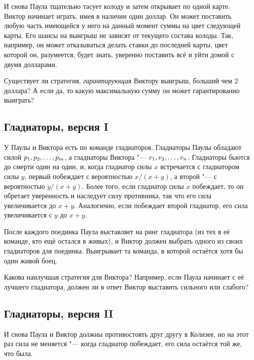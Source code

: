 \documentclass[twoside]{book}
\makeatletter
\newcommand{\rindex}[2][\imki@jobname]{%
  \index[#1]{\detokenize{#2}}%
}
\makeatother
\begin{document}
И снова Паула тщательно тасует колоду и затем открывает по одной карте.
Виктор начинает играть, имея в наличии один доллар.
Он может поставить  любую часть имеющейся у него на данный момент суммы на цвет следующей карты.
Его шансы на выигрыш не зависят от текущего состава колоды.
Так, например, он может отказываться делать ставки до последней карты, цвет которой он, разумеется, будет знать, уверенно поставить всё и уйти домой с двумя долларами.


Существует ли стратегия, \emph{гарантирующая} Виктору выигрыш, больший чем 2 доллара?
А если да, то какую максимальную сумму он может гарантированно выиграть? 

\subsection*{Гладиаторы, версия I} %
\rindex{Гладиаторы, версия I}

У Паулы и Виктора есть по команде гладиаторов.
Гладиаторы Паулы обладают силой $p_1, p_2,\z\dots, p_m$, а гладиаторы Виктора "--- $v_1, v_2,\z\dots, v_n$.
Гладиаторы бьются до смерти один на один, и, когда гладиатор силы $x$ встречается с гладиатором силы $y$, первый побеждает с вероятностью $x/(x+y)$, а второй "--- с вероятностью $y/(x+y)$.
Более того, если гладиатор силы $x$ побеждает, то он обретает уверенность и наследует силу противника, так что его сила увеличивается до $x+y$.
Аналогично, если побеждает второй гладиатор, его сила увеличивается с $y$ до $x+y$.

После каждого поединка Паула выставляет на ринг гладиатора (из тех в её команде, кто ещё остался в живых), и Виктор должен выбрать одного из своих гладиаторов для поединка.
Выигрывает та команда, в которой остаётся хотя бы один живой боец.


Какова наилучшая стратегия для Виктора?
Например, если Паула начинает с её лучшего гладиатора, должен ли в ответ Виктор выставить сильного или слабого?

\pagebreak[3]

\subsection*{Гладиаторы, версия II} %
\rindex{Гладиаторы, версия II}

И снова Паула и Виктор должны противостоять друг другу в Колизее, но на этот раз сила не меняется "--- когда гладиатор побеждает, его сила остаётся той же, что была.
\end{document}
